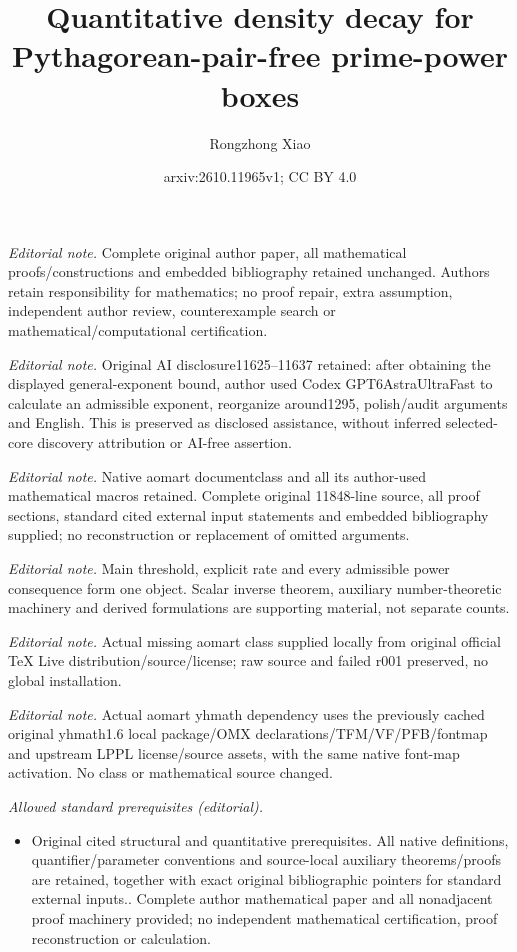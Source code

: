 \documentclass[twoside]{aomart}
\title{Quantitative density decay for Pythagorean-pair-free prime-power boxes}
\author{Rongzhong Xiao}
\date{arxiv:2610.11965v1; CC BY 4.0}
\theoremstyle{paperplain}
\theoremstyle{paperdefinition}
\numberwithin{equation}{section}
\begin{document}
\maketitle
\noindent\textit{Editorial note.} Complete original author paper, all mathematical proofs/constructions and embedded bibliography retained unchanged. Authors retain responsibility for mathematics; no proof repair, extra assumption, independent author review, counterexample search or mathematical/computational certification.\par\medskip
\noindent\textit{Editorial note.} Original AI disclosure11625--11637 retained: after obtaining the displayed general-exponent bound, author used Codex GPT6AstraUltraFast to calculate an admissible exponent, reorganize around1295, polish/audit arguments and English. This is preserved as disclosed assistance, without inferred selected-core discovery attribution or AI-free assertion.\par\medskip
\noindent\textit{Editorial note.} Native aomart documentclass and all its author-used mathematical macros retained. Complete original 11848-line source, all proof sections, standard cited external input statements and embedded bibliography supplied; no reconstruction or replacement of omitted arguments.\par\medskip
\noindent\textit{Editorial note.} Main threshold, explicit rate and every admissible power consequence form one object. Scalar inverse theorem, auxiliary number-theoretic machinery and derived formulations are supporting material, not separate counts.\par\medskip
\noindent\textit{Editorial note.} Actual missing aomart class supplied locally from original official TeX Live distribution/source/license; raw source and failed r001 preserved, no global installation.\par\medskip
\noindent\textit{Editorial note.} Actual aomart yhmath dependency uses the previously cached original yhmath1.6 local package/OMX declarations/TFM/VF/PFB/fontmap and upstream LPPL license/source assets, with the same native font-map activation. No class or mathematical source changed.\par\medskip
\noindent\textit{Allowed standard prerequisites (editorial).}\begin{itemize}
\item Original cited structural and quantitative prerequisites. All native definitions, quantifier/parameter conventions and source-local auxiliary theorems/proofs are retained, together with exact original bibliographic pointers for standard external inputs.. Complete author mathematical paper and all nonadjacent proof machinery provided; no independent mathematical certification, proof reconstruction or calculation.
\end{itemize}\medskip
\maketitle
\begingroup
\color{ContentsBlue}
\hypersetup{linkcolor=ContentsBlue}
\tableofcontents
\par\removelastskip
\endgroup
\end{document}
